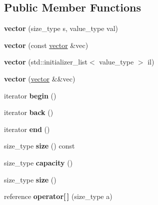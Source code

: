 \subsection*{Public Member Functions}
\begin{DoxyCompactItemize}
\item 
\mbox{\label{classvector_accc1231a7660399f4e0072d4e21d8ce4}} 
{\bfseries vector} (size\+\_\+type s, value\+\_\+type val)
\item 
\mbox{\label{classvector_a76fb1f7d942a645e3559b5d36b3946eb}} 
{\bfseries vector} (const \mbox{\hyperlink{classvector}{vector}} \&vec)
\item 
\mbox{\label{classvector_ae5bc1c36c5f1fe2e9a6071745c2393ae}} 
{\bfseries vector} (std\+::initializer\+\_\+list$<$ value\+\_\+type $>$ il)
\item 
\mbox{\label{classvector_a7cc5d96359fdceebd9db381673a88fb0}} 
{\bfseries vector} (\mbox{\hyperlink{classvector}{vector}} \&\&vec)
\item 
\mbox{\label{classvector_a7aecb965ffda6737cc461c9316d878f2}} 
iterator {\bfseries begin} ()
\item 
\mbox{\label{classvector_aea0c65910a04c3a91b1599ce643dbdb7}} 
iterator {\bfseries back} ()
\item 
\mbox{\label{classvector_ad18d9638b1d68f0398794ba0da4504a9}} 
iterator {\bfseries end} ()
\item 
\mbox{\label{classvector_af7961c7a6accd1fd521956a6b35cb2d2}} 
size\+\_\+type {\bfseries size} () const
\item 
\mbox{\label{classvector_aa46e051677c49ebc0f67ad2a5e60b44f}} 
size\+\_\+type {\bfseries capacity} ()
\item 
\mbox{\label{classvector_aae43a9db51e770527666075d25faf3d6}} 
size\+\_\+type {\bfseries size} ()
\item 
\mbox{\label{classvector_a7fc94e1ae30690b5ec1f019238c2d76b}} 
reference {\bfseries operator\mbox{[}$\,$\mbox{]}} (size\+\_\+type a)

\end{DoxyCompactItemize}
